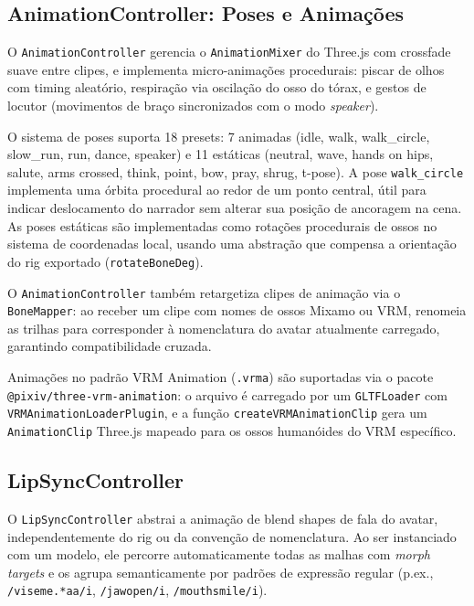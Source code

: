 \documentclass[
  12pt,
  openright,
  twoside,
  a4paper,
  english,
  brazil
]{abntex2}
\begin{document}
\subsection{AnimationController: Poses e Animações}
\label{subsec:animation-controller}

O \texttt{AnimationController} gerencia o \texttt{AnimationMixer} do
Three.js com crossfade suave entre clipes, e implementa micro-animações
procedurais: piscar de olhos com timing aleatório, respiração via
oscilação do osso do tórax, e gestos de locutor (movimentos de braço
sincronizados com o modo \textit{speaker}).

O sistema de poses suporta 18 presets: 7 animadas (idle, walk,
walk\_circle, slow\_run, run, dance, speaker) e 11 estáticas (neutral,
wave, hands on hips, salute, arms crossed, think, point, bow, pray,
shrug, t-pose). A pose \texttt{walk\_circle} implementa uma órbita
procedural ao redor de um ponto central, útil para indicar deslocamento
do narrador sem alterar sua posição de ancoragem na cena. As poses
estáticas são implementadas como rotações procedurais de ossos no
sistema de coordenadas local, usando uma abstração que compensa a
orientação do rig exportado (\texttt{rotateBoneDeg}).

O \texttt{AnimationController} também retargetiza clipes de animação
via o \texttt{BoneMapper}: ao receber um clipe com nomes de ossos
Mixamo ou VRM, renomeia as trilhas para corresponder à nomenclatura do
avatar atualmente carregado, garantindo compatibilidade cruzada.

Animações no padrão VRM Animation (\texttt{.vrma}) são suportadas via
o pacote \texttt{@pixiv/three-vrm-animation}: o arquivo é carregado por
um \texttt{GLTFLoader} com \texttt{VRMAnimationLoaderPlugin}, e a função
\texttt{createVRMAnimationClip} gera um \texttt{AnimationClip} Three.js
mapeado para os ossos humanóides do VRM específico.

\subsection{LipSyncController}
\label{subsec:lipsync-impl}

O \texttt{LipSyncController} abstrai a animação de blend shapes de fala
do avatar, independentemente do rig ou da convenção de nomenclatura.
Ao ser instanciado com um modelo, ele percorre automaticamente todas as
malhas com \textit{morph targets} e os agrupa semanticamente por
padrões de expressão regular (p.ex., \texttt{/viseme.*aa/i},
\texttt{/jawopen/i}, \texttt{/mouthsmile/i}).
\end{document}
